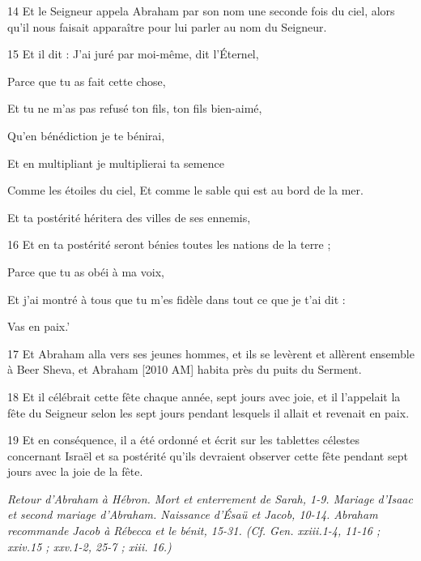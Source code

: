 \par 14 Et le Seigneur appela Abraham par son nom une seconde fois du ciel, alors qu'il nous faisait apparaître pour lui parler au nom du Seigneur.
\par 15 Et il dit : J'ai juré par moi-même, dit l'Éternel,
\par    
\par     Parce que tu as fait cette chose,  
\par     Et tu ne m'as pas refusé ton fils, ton fils bien-aimé,  
\par     Qu'en bénédiction je te bénirai,
\par    
\par     Et en multipliant je multiplierai ta semence  
\par     Comme les étoiles du ciel, Et comme le sable qui est au bord de la mer.
\par    
\par     Et ta postérité héritera des villes de ses ennemis,  
\par    
\par 16 Et en ta postérité seront bénies toutes les nations de la terre ;
\par    
\par     Parce que tu as obéi à ma voix,  
\par     Et j’ai montré à tous que tu m’es fidèle dans tout ce que je t’ai dit :
\par    
\par     Vas en paix.'
\par    
\par 17 Et Abraham alla vers ses jeunes hommes, et ils se levèrent et allèrent ensemble à Beer Sheva, et Abraham [2010 AM] habita près du puits du Serment.
\par 18 Et il célébrait cette fête chaque année, sept jours avec joie, et il l'appelait la fête du Seigneur selon les sept jours pendant lesquels il allait et revenait en paix.
\par 19 Et en conséquence, il a été ordonné et écrit sur les tablettes célestes concernant Israël et sa postérité qu'ils devraient observer cette fête pendant sept jours avec la joie de la fête.


\par \textit{Retour d'Abraham à Hébron. Mort et enterrement de Sarah, 1-9. Mariage d'Isaac et second mariage d'Abraham. Naissance d'Ésaü et Jacob, 10-14. Abraham recommande Jacob à Rébecca et le bénit, 15-31. (Cf. Gen. xxiii.1-4, 11-16 ; xxiv.15 ; xxv.1-2, 25-7 ; xiii. 16.)}

